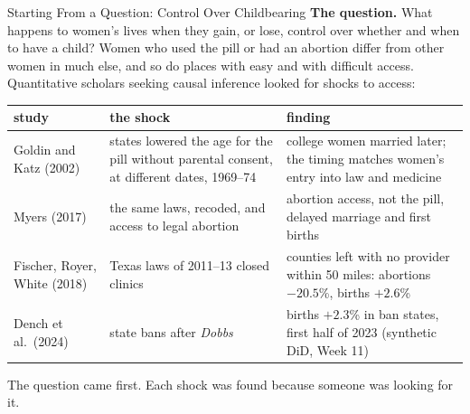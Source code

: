 \documentclass[aspectratio=169,11pt,xcolor=dvipsnames]{beamer}
\begin{document}
\begin{frame}{Starting From a Question: Control Over Childbearing}
\textbf{The question.} What happens to women's lives when they gain, or lose, control over
whether and when to have a child? Women who used the pill or had an abortion differ from other
women in much else, and so do places with easy and with difficult access. Quantitative
scholars seeking causal inference looked for shocks to access:
\begin{center}\footnotesize
\renewcommand{\arraystretch}{1.02}
\begin{tabular}{@{}>{\raggedright\arraybackslash}p{3.0cm}>{\raggedright\arraybackslash}p{4.7cm}>{\raggedright\arraybackslash}p{5.8cm}@{}}
\toprule
study & the shock & finding \\
\midrule
Goldin and Katz (2002) & states lowered the age for the pill without parental consent, at different
  dates, 1969--74 & college women married later; the timing matches women's entry into law and
  medicine \\
Myers (2017) & the same laws, recoded, and access to legal abortion & abortion access, not
  the pill, delayed marriage and first births \\
Fischer, Royer, White (2018) & Texas laws of 2011--13 closed clinics & counties left with no
  provider within 50 miles: abortions $-20.5$\%, births $+2.6$\% \\
Dench et al.\ (2024) & state bans after \textit{Dobbs} & births $+2.3$\% in ban
  states, first half of 2023 (synthetic DiD, Week 11) \\
\bottomrule
\end{tabular}
\end{center}
\vskip-2pt
{\small The question came first. Each shock was found because someone was looking for it.}
\end{frame}
\end{document}
